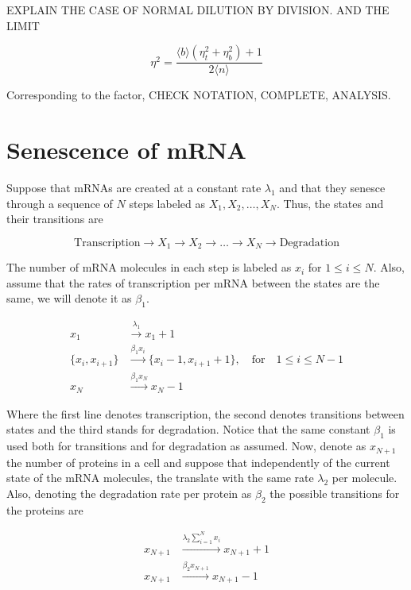 EXPLAIN THE CASE OF NORMAL DILUTION BY DIVISION. AND THE LIMIT

\begin{equation}
  \boxed{\eta^2 = \frac{\langle b\rangle\left(\eta^2_t + \eta^2_b\right)+1}{2\langle n\rangle}}
\end{equation}

Corresponding to the factor, CHECK NOTATION, COMPLETE, ANALYSIS.

\section{Senescence of mRNA}

Suppose that mRNAs are created at a constant rate $\lambda_1$ and that they senesce through a sequence of $N$ steps labeled as $X_1,X_2,\dotsc,X_N$. Thus, the states and their transitions are

\begin{equation}
  \text{Transcription} \rightarrow X_1 \rightarrow X_2 \rightarrow \dots \rightarrow X_N \rightarrow \text{Degradation}
\end{equation}

The number of mRNA molecules in each step is labeled as $x_i$ for $1\leq i\leq N$. Also, assume that the rates of transcription per mRNA between the states are the same, we will denote it as $\beta_1$.

\begin{equation}
  \begin{split}
    x_1&\xrightarrow{\lambda_1}x_1+1\\
    \{x_i,x_{i+1}\}&\xrightarrow{\beta_1x_i} \{x_i-1,x_{i+1}+1\},\quad \text{for}\quad1\leq i\leq N-1\\
    x_N&\xrightarrow{\beta_1x_N} x_N-1
  \end{split}
\end{equation}

Where the first line denotes transcription, the second denotes transitions between states and the third stands for degradation. Notice that the same constant $\beta_1$ is used both for transitions and for degradation as assumed. Now, denote as $x_{N+1}$ the number of proteins in a cell and suppose that independently of the current state of the mRNA molecules, the translate with the same rate $\lambda_2$ per molecule. Also, denoting the degradation rate per protein as $\beta_2$ the possible transitions for the proteins are

\begin{equation}
  \begin{split}
    x_{N+1} &\xrightarrow{\lambda_2\sum_{i=1}^Nx_i} x_{N+1}+1\\
    x_{N+1} &\xrightarrow{\beta_2x_{N+1}}x_{N+1}-1
  \end{split}
\end{equation}

